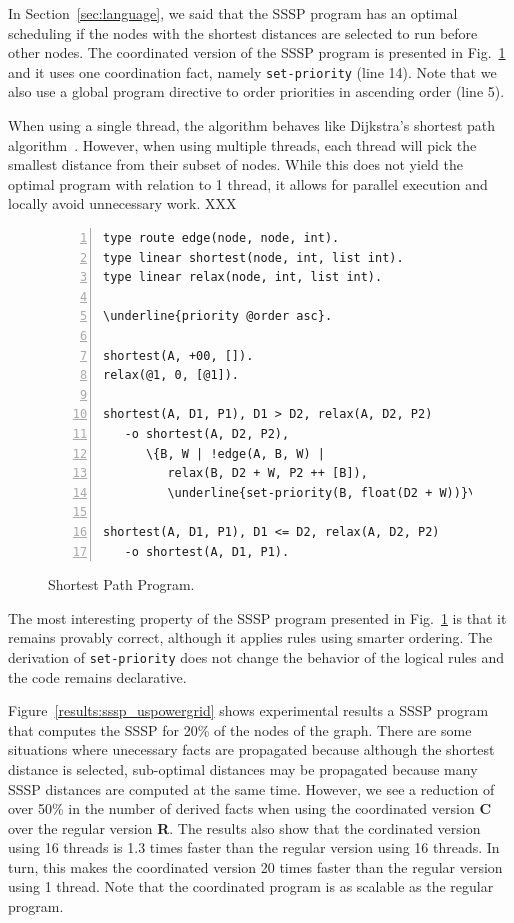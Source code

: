 In Section~\ref{sec:language}, we said that the SSSP program has an optimal
scheduling if the nodes with the shortest distances are selected to run before
other nodes.  The coordinated version of the SSSP
program is presented in Fig.~\ref{code:shortest_path_program_coord} and it
uses one coordination fact, namely \texttt{set-priority} (line 14). Note that we
also use a global program directive to order priorities in ascending order (line
5).

When using a single thread, the algorithm behaves like
Dijkstra's shortest path algorithm~\cite{Dijkstra}. However, when using multiple
threads, each thread will pick the smallest distance from their subset of nodes.
While this does not yield the optimal program with relation to 1 thread, it
allows for parallel execution and locally avoid unnecessary work. XXX

\begin{figure}[h!]
\scriptsize\begin{Verbatim}[numbers=left,commandchars=\\\{\}]
type route edge(node, node, int).
type linear shortest(node, int, list int).
type linear relax(node, int, list int).

\underline{priority @order asc}.

shortest(A, +00, []).
relax(@1, 0, [@1]).

shortest(A, D1, P1), D1 > D2, relax(A, D2, P2)
   -o shortest(A, D2, P2),
      \{B, W | !edge(A, B, W) |
         relax(B, D2 + W, P2 ++ [B]),
         \underline{set-priority(B, float(D2 + W))}\}.

shortest(A, D1, P1), D1 <= D2, relax(A, D2, P2)
   -o shortest(A, D1, P1).
\end{Verbatim}
  \caption{Shortest Path Program.}
  \label{code:shortest_path_program_coord}
\end{figure}
\normalsize

The most interesting property of the SSSP program presented in
Fig.~\ref{code:shortest_path_program_coord} is that it remains provably correct,
although it applies rules using smarter ordering. The derivation of
\texttt{set-priority} does not change the behavior of the logical rules and the
code remains declarative.

Figure~\ref{results:sssp_uspowergrid} shows experimental results a
SSSP program that computes the SSSP for 20\% of the nodes of the graph.
There are some situations where unecessary facts are propagated
because although the shortest distance is selected, sub-optimal distances may be
propagated because many SSSP distances are computed at the same time.
However, we see a reduction of over 50\% in the number of
derived facts when using the coordinated version \textbf{C} over the regular
version \textbf{R}. The results also show that the cordinated
version using 16 threads is 1.3 times faster than the regular version using 16
threads. In turn, this makes the coordinated version 20 times faster
than the regular version using 1 thread. Note that the coordinated program is as
scalable as the regular program.

